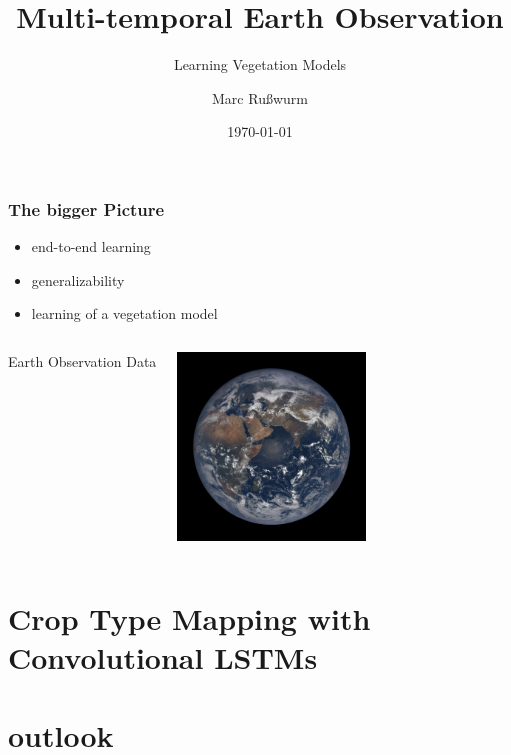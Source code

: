 \documentclass[%
  aspectratio=169,
  9pt,
  USenglish,
  titlegraphic, %
  affiliationintitlepagehead,
  progressbar,
]{beamer}
\title{Multi-temporal Earth Observation}
\subtitle{Learning Vegetation Models}
\author[M. Rußwurm]{Marc Rußwurm}
\institute[TUM]{Technical University of Munich, Germany\\
                Remote Sensing Technology}
\date{\today}
\begin{document}
\begin{frame}[t]
  \titlepage
\end{frame}

\begin{frame}
  \frametitle{The bigger Picture}
  \begin{itemize}
  	\item end-to-end learning
  	\item generalizability
  	\item learning of a vegetation model
  \end{itemize}
\end{frame}


{
	\begin{frame}[plain]
	
	\vfill
	\Huge\color{white}
	\begin{center}
		\begin{columns}
			\vspace{7em}
			
			\hfill 
			Earth Observation Data
			
			\includegraphics[width=5cm]{images/epic1}
		\end{columns}
	\end{center}
	
	\vfill
\end{frame}
}



\section{Crop Type Mapping with Convolutional LSTMs}



\section{outlook}
\end{document}
